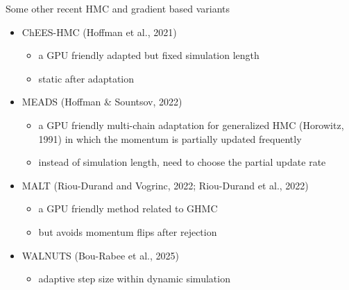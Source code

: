 \documentclass[finnish,english,t]{beamer}
\begin{document}
\begin{frame}{Some other recent HMC and gradient based variants}

  \begin{itemize}
  \item ChEES-HMC (Hoffman et al., 2021)
    \begin{itemize}
    \item a GPU friendly adapted but fixed simulation length
    \item static after adaptation
    \end{itemize}
  \item MEADS (Hoffman \& Sountsov, 2022)
    \begin{itemize}
    \item a GPU friendly multi-chain adaptation for generalized HMC (Horowitz, 1991) in
      which the momentum is partially updated frequently
    \item instead of simulation length, need to choose the partial
      update rate
    \end{itemize}
  \item MALT (Riou-Durand and Vogrinc, 2022; Riou-Durand et al., 2022)
    \begin{itemize}
    \item a GPU friendly method related to GHMC
    \item but avoids momentum flips after rejection
    \end{itemize}
  \item WALNUTS (Bou-Rabee et al., 2025)
    \begin{itemize}
    \item adaptive step size within dynamic simulation
    \end{itemize}
  \end{itemize}
  
\end{frame}
\end{document}
